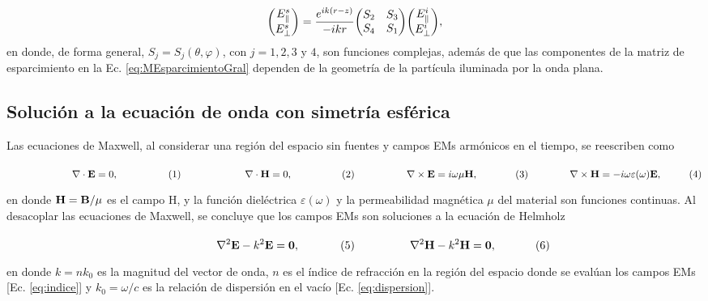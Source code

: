 	\begin{align}
	\mqty(E_{\parallel}^s\\E_{\perp}^s) = 
		\frac{e^{ik(r-z)}}{-ikr} \mqty(S_2&S_3\\S_4&S_1)
	\mqty(E_{\parallel}^i\\E_{\perp}^i),\label{eq:MEsparcimientoGral}
	\end{align}
en donde, de forma general, $S_j = S_j(\theta,\varphi)$, con $j=1,2,3$ y $4$, son funciones complejas, además de que las componentes de la matriz de esparcimiento en la Ec. \eqref{eq:MEsparcimientoGral} dependen de la geometría de la partícula iluminada por la onda plana.

	\subsection{Solución a la ecuación de onda con simetría esférica}


Las ecuaciones de Maxwell, al considerar una región del espacio sin fuentes y campos EMs armónicos en el tiempo, se reescriben como \cite{jackson1999electrodynamics} 

	\begin{subequations}
	\eqhalf{\nabla\cdot \vb{E} = 0, }
	\eqhalf{\nabla\cdot \vb{H} = 0,}
	\eqhalf{\nabla \times \vb{E} = i\omega\mu \vb{H}, \label{seq:FLArm}}
	\eqhalf{\nabla\times\vb{H} = - i \omega\varepsilon(\omega) \vb{E}, }	
	\label{eqs:MaxwellArm}
	\end{subequations} \vspace*{-1em}
	
\noindent	
en donde $\vb{H} = \vb{B}/\mu$ es el campo H, y la función dieléctrica $\varepsilon(\omega)$ y la permeabilidad magnética $\mu$ del material son funciones continuas. Al desacoplar las ecuaciones de Maxwell, se concluye que los campos EMs son soluciones a la ecuación de Helmholz \cite{jackson1999electrodynamics}

	\begin{subequations}
	\eqhalf{\nabla^2 \vb{E}- k^2 \vb{E} = \vb{0},}
	\eqhalf{\nabla^2 \vb{H}- k^2 \vb{H} = \vb{0},}
	\label{eq:Helmholtz}
	\end{subequations} \vspace*{-1em}

\noindent	
en donde $k = n k_0$ es la magnitud del vector de onda, $n$ es el índice de refracción en la región del espacio donde se evalúan los campos EMs [Ec. \eqref{eq:indice}] y $k_0 = \omega / c$ es la relación de dispersión en el vacío [Ec. \eqref{eq:dispersion}].

